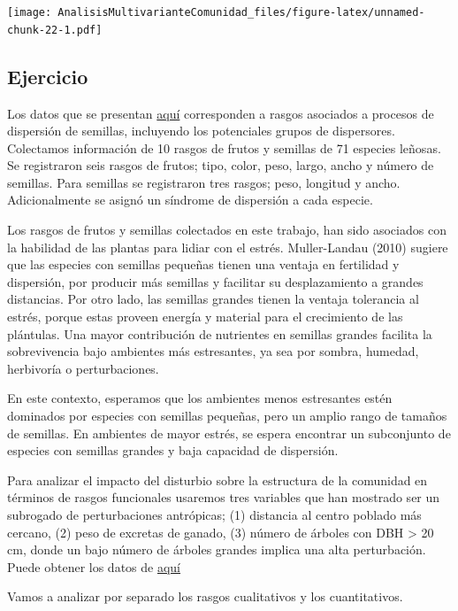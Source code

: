 \documentclass[]{book}
\begin{document}
\texttt{[image: AnalisisMultivarianteComunidad\_files/figure-latex/unnamed-chunk-22-1.pdf]}

\subsection{Ejercicio}\label{ejercicio}

Los datos que se presentan
\href{\%22https://github.com/Ciespinosa/AnalisisMultivariante/TraitsVege.csv\%22}{aquí}
corresponden a rasgos asociados a procesos de dispersión de semillas,
incluyendo los potenciales grupos de dispersores. Colectamos información
de 10 rasgos de frutos y semillas de 71 especies leñosas. Se registraron
seis rasgos de frutos; tipo, color, peso, largo, ancho y número de
semillas. Para semillas se registraron tres rasgos; peso, longitud y
ancho. Adicionalmente se asignó un síndrome de dispersión a cada
especie.

Los rasgos de frutos y semillas colectados en este trabajo, han sido
asociados con la habilidad de las plantas para lidiar con el estrés.
Muller-Landau (2010) sugiere que las especies con semillas pequeñas
tienen una ventaja en fertilidad y dispersión, por producir más semillas
y facilitar su desplazamiento a grandes distancias. Por otro lado, las
semillas grandes tienen la ventaja tolerancia al estrés, porque estas
proveen energía y material para el crecimiento de las plántulas. Una
mayor contribución de nutrientes en semillas grandes facilita la
sobrevivencia bajo ambientes más estresantes, ya sea por sombra,
humedad, herbivoría o perturbaciones.

En este contexto, esperamos que los ambientes menos estresantes estén
dominados por especies con semillas pequeñas, pero un amplio rango de
tamaños de semillas. En ambientes de mayor estrés, se espera encontrar
un subconjunto de especies con semillas grandes y baja capacidad de
dispersión.

Para analizar el impacto del disturbio sobre la estructura de la
comunidad en términos de rasgos funcionales usaremos tres variables que
han mostrado ser un subrogado de perturbaciones antrópicas; (1)
distancia al centro poblado más cercano, (2) peso de excretas de ganado,
(3) número de árboles con DBH \textgreater{} 20 cm, donde un bajo número
de árboles grandes implica una alta perturbación. Puede obtener los
datos de
\href{\%22https://github.com/Ciespinosa/AnalisisMultivariante/Parcelas.csv\%22}{aquí}

Vamos a analizar por separado los rasgos cualitativos y los
cuantitativos.
\end{document}
